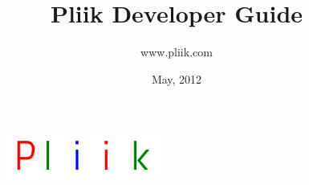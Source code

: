 \documentclass[10pt,letterpaper,titlepage]{article}
\author{www.pliik.com}
\title{Pliik Developer Guide}
\date{May, 2012}
\begin{document}
\begin{figure}
\begin{center}
\includegraphics[width=50mm]{logo.png}
\end{center}
\end{figure}
\maketitle{}

\newpage


\end{document}
